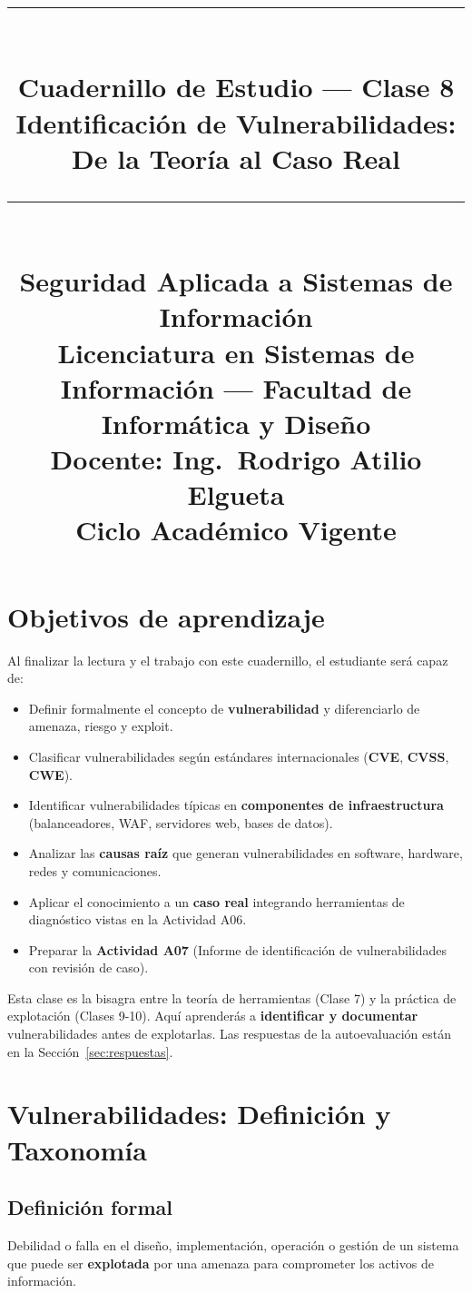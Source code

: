 \documentclass[11pt,a4paper]{article}
\title{%
  \rule{\textwidth}{1pt}\\[0.4cm]
  \textbf{\Large Cuadernillo de Estudio --- Clase 8}\\[0.2cm]
  \large Identificación de Vulnerabilidades: De la Teoría al Caso Real\\[0.2cm]
  \rule{\textwidth}{1pt}\\[0.4cm]
  \normalsize Seguridad Aplicada a Sistemas de Información\\
  Licenciatura en Sistemas de Información --- Facultad de Informática y Diseño\\
  Docente: Ing.\ Rodrigo Atilio Elgueta\\[0.2cm]
  \small Ciclo Académico Vigente
}
\author{}
\date{}
\begin{document}
\maketitle
\thispagestyle{fancy}
\tableofcontents
\newpage

\section{Objetivos de aprendizaje}
Al finalizar la lectura y el trabajo con este cuadernillo, el estudiante será capaz de:

\begin{itemize}[leftmargin=*]
  \item Definir formalmente el concepto de \textbf{vulnerabilidad} y diferenciarlo de amenaza, riesgo y exploit.
  \item Clasificar vulnerabilidades según estándares internacionales (\textbf{CVE}, \textbf{CVSS}, \textbf{CWE}).
  \item Identificar vulnerabilidades típicas en \textbf{componentes de infraestructura} (balanceadores, WAF, servidores web, bases de datos).
  \item Analizar las \textbf{causas raíz} que generan vulnerabilidades en software, hardware, redes y comunicaciones.
  \item Aplicar el conocimiento a un \textbf{caso real} integrando herramientas de diagnóstico vistas en la Actividad A06.
  \item Preparar la \textbf{Actividad A07} (Informe de identificación de vulnerabilidades con revisión de caso).
\end{itemize}

\begin{clave}
Esta clase es la bisagra entre la teoría de herramientas (Clase 7) y la práctica de explotación (Clases 9-10). Aquí aprenderás a \textbf{identificar y documentar} vulnerabilidades antes de explotarlas. Las respuestas de la autoevaluación están en la Sección~\ref{sec:respuestas}.
\end{clave}

\section{Vulnerabilidades: Definición y Taxonomía}

\subsection{Definición formal}
\begin{definicion}[Vulnerabilidad]
Debilidad o falla en el diseño, implementación, operación o gestión de un sistema que puede ser \textbf{explotada} por una amenaza para comprometer los activos de información.
\end{definicion}
\end{document}
